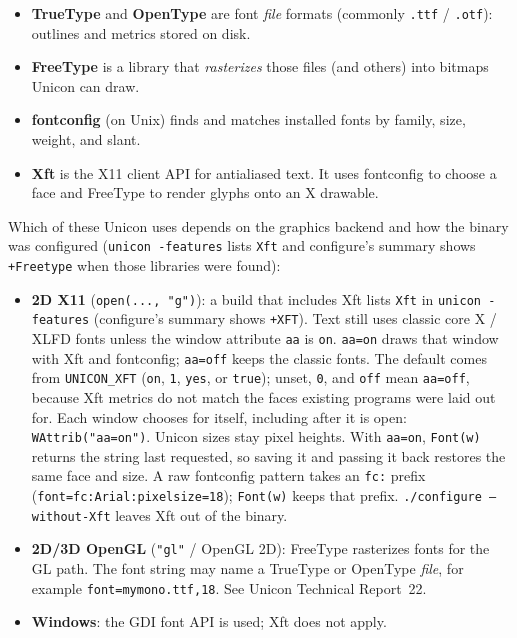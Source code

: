 \begin{itemize}\itemsep0pt
\item \textbf{TrueType} and \textbf{OpenType} are font \emph{file}
  formats (commonly \texttt{.ttf} / \texttt{.otf}): outlines and
  metrics stored on disk.
\item \textbf{FreeType} is a library that \emph{rasterizes} those
  files (and others) into bitmaps Unicon can draw.
\item \textbf{fontconfig} (on Unix) finds and matches installed fonts
  by family, size, weight, and slant.
\item \textbf{Xft} is the X11 client API for antialiased text. It uses
  fontconfig to choose a face and FreeType to render glyphs onto an
  X drawable.
\end{itemize}

Which of these Unicon uses depends on the graphics backend and how
the binary was configured (\texttt{unicon -features} lists
\texttt{Xft} and configure's summary shows \texttt{+Freetype}
when those libraries were found):

\begin{itemize}\itemsep0pt
\item \textbf{2D X11} (\texttt{open(..., "g")}): a build that
  includes Xft lists \texttt{Xft} in \texttt{unicon -features}
  (configure's summary shows \texttt{+XFT}). Text still uses classic
  core X / XLFD fonts unless the window attribute \texttt{aa} is
  \texttt{on}. \texttt{aa=on} draws that window with Xft and
  fontconfig; \texttt{aa=off} keeps the classic fonts. The default
  comes from \texttt{UNICON\_XFT} (\texttt{on}, \texttt{1},
  \texttt{yes}, or \texttt{true}); unset, \texttt{0}, and
  \texttt{off} mean \texttt{aa=off}, because Xft metrics do not
  match the faces existing programs were laid out for. Each window
  chooses for itself, including after it is open:
  \texttt{WAttrib("aa=on")}. Unicon sizes stay pixel heights.
  With \texttt{aa=on}, \texttt{Font(w)} returns the string last
  requested, so saving it and passing it back restores the same face
  and size. A raw fontconfig pattern takes an \texttt{fc:} prefix
  (\texttt{font=fc:Arial:pixelsize=18}); \texttt{Font(w)} keeps that
  prefix.
  \texttt{./configure --without-Xft} leaves Xft out of the binary.
\item \textbf{2D/3D OpenGL} (\texttt{"gl"} / OpenGL 2D): FreeType
  rasterizes fonts for the GL path. The font string may name a
  TrueType or OpenType \emph{file}, for example
  \texttt{font=mymono.ttf,18}. See Unicon Technical Report~22.
\item \textbf{Windows}: the GDI font API is used; Xft does not apply.
\end{itemize}


